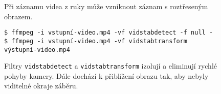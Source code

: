 \begingroup
\begin{subfigure}{\linewidth}

\vspace{-4pt}

\caption{Při záznamu videa z ruky může vzniknout záznam s roztřeseným obrazem.}
\end{subfigure}
%
\par\vspace{10pt}%
\begin{subfigure}{\linewidth}
\begingroup
\small
\begin{verbatim}
$ ffmpeg -i vstupní-video.mp4 -vf vidstabdetect -f null -
$ ffmpeg -i vstupní-video.mp4 -vf vidstabtransform výstupní-video.mp4
\end{verbatim}
\endgroup

\caption{Filtry \texttt{vidstabdetect} a \texttt{vidstabtransform} izolují a eliminují rychlé pohyby kamery. Dále dochází k přiblížení obrazu tak, aby nebyly viditelné okraje záběru.}
\end{subfigure}
\endgroup